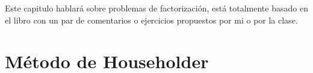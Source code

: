 Este capitulo hablará sobre problemas de factorización, está totalmente basado en el libro \cite{MR2597943} con un par de comentarios o ejercicios propuestos por mi o por la clase. 
\section{Método de Householder}

